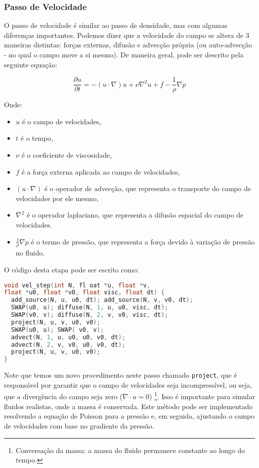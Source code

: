 \subsubsection{Passo de Velocidade}
O passo de velocidade é similar ao passo de densidade, mas com algumas diferenças importantes. Podemos dizer que a velocidade do campo se altera de 3 maneiras distintas: forças externas, difusão e advecção própria (ou auto-advecção - no qual o campo move a si mesmo). De maneira geral, pode ser descrito pela seguinte equação:

$$\frac{\partial u}{\partial t} = - (u \cdot \nabla) u + \nu \nabla^2 u + f - \frac{1}{\rho} \nabla p$$

Onde:
\begin{itemize}
  \item $u$ é o campo de velocidades,
  \item $t$ é o tempo,
  \item $\nu$ é o coeficiente de viscosidade,
  \item $f$ é a força externa aplicada ao campo de velocidades,
  \item $(u \cdot \nabla)$ é o operador de advecção, que representa o transporte do campo de velocidades por ele mesmo,
  \item $\nabla^2$ é o operador laplaciano, que representa a difusão espacial do campo de velocidades.
  \item $\frac{1}{\rho} \nabla p$ é o termo de pressão, que representa a força devido à variação de pressão no fluido.
\end{itemize}

O código desta etapa pode ser escrito como:

\begin{lstlisting}[language=C]
void vel_step(int N, fl oat *u, float *v, 
float *u0, float *v0, float visc, float dt) {
  add_source(N, u, u0, dt); add_source(N, v, v0, dt);
  SWAP(u0, u); diffuse(N, 1, u, u0, visc, dt);
  SWAP(v0, v); diffuse(N, 2, v, v0, visc, dt);
  project(N, u, v, u0, v0);
  SWAP(u0, u); SWAP( v0, v);
  advect(N, 1, u, u0, u0, v0, dt);
  advect(N, 2, v, v0, u0, v0, dt);
  project(N, u, v, u0, v0);
}
\end{lstlisting}

Note que temos um novo procedimento neste passo chamado \texttt{project}, que é responsável por garantir que o campo de velocidades seja incompressível, ou seja, que a divergência do campo seja zero ($\nabla \cdot u = 0$) \footnote{Conversação da massa:  a massa do fluido permanece constante ao longo do tempo.}. Isso é importante para simular fluidos realistas, onde a massa é conservada. Este método pode ser implementado resolvendo a equação de Poisson para a pressão e, em seguida, ajustando o campo de velocidades com base no gradiente da pressão.


